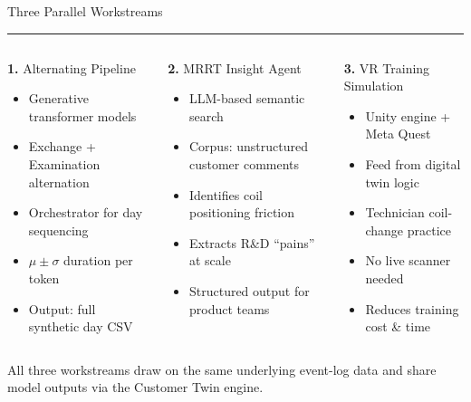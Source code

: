 \documentclass[aspectratio=169,12pt]{beamer}
\newcommand{\tealsep}{\vspace{1pt}\textcolor{SiemensTeal}{\rule{\linewidth}{1pt}}\vspace{4pt}}
\begin{document}
\begin{frame}[shrink=20]{Three Parallel Workstreams}
\tealsep
\begin{columns}[T]
\begin{block}{\textbf{1.} Alternating Pipeline}
  \begin{itemize}\setlength\itemsep{4pt}
    \item Generative transformer models
    \item Exchange + Examination alternation
    \item Orchestrator for day sequencing
    \item $\mu \pm \sigma$ duration per token
    \item Output: full synthetic day CSV
  \end{itemize}
\end{block}

\begin{exampleblock}{\textbf{2.} MRRT Insight Agent}
  \begin{itemize}\setlength\itemsep{4pt}
    \item LLM-based semantic search
    \item Corpus: unstructured customer comments
    \item Identifies coil positioning friction
    \item Extracts R\&D ``pains'' at scale
    \item Structured output for product teams
  \end{itemize}
\end{exampleblock}

\begin{alertblock}{\textbf{3.} VR Training Simulation}
  \begin{itemize}\setlength\itemsep{4pt}
    \item Unity engine + Meta Quest
    \item Feed from digital twin logic
    \item Technician coil-change practice
    \item No live scanner needed
    \item Reduces training cost \& time
  \end{itemize}
\end{alertblock}
\end{columns}
\vspace{8pt}
\textcolor{SiemensMuted}{\footnotesize All three workstreams draw on the same underlying event-log data and share model outputs via the Customer Twin engine.}
\end{frame}
\end{document}
